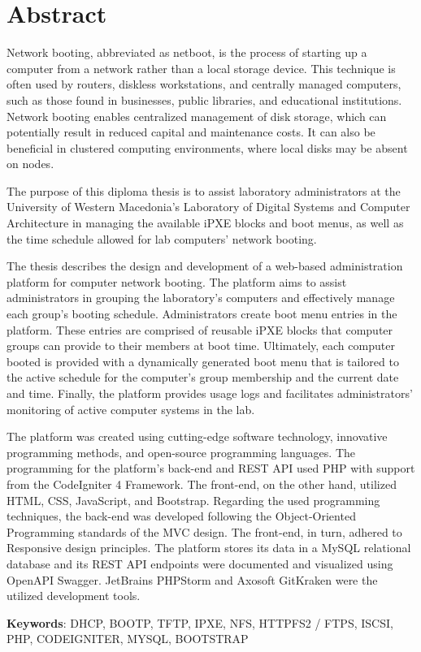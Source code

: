 \chapter*{Abstract}
Network booting, abbreviated as netboot, is the process of starting up a computer from a network rather than a local storage device. This technique is often used by routers, diskless workstations, and centrally managed computers, such as those found in businesses, public libraries, and educational institutions. Network booting enables centralized management of disk storage, which can potentially result in reduced capital and maintenance costs. It can also be beneficial in clustered computing environments, where local disks may be absent on nodes.

The purpose of this diploma thesis is to assist laboratory administrators at the University of Western Macedonia's Laboratory of Digital Systems and Computer Architecture in managing the available iPXE blocks and boot menus, as well as the time schedule allowed for lab computers' network booting.

The thesis describes the design and development of a web-based administration platform for computer network booting. The platform aims to assist administrators in grouping the laboratory's computers and effectively manage each group's booting schedule. Administrators create boot menu entries in the platform. These entries are comprised of reusable iPXE blocks that computer groups can provide to their members at boot time. Ultimately, each computer booted is provided with a dynamically generated boot menu that is tailored to the active schedule for the computer's group membership and the current date and time. Finally, the platform provides usage logs and facilitates administrators' monitoring of active computer systems in the lab.

The platform was created using cutting-edge software technology, innovative programming methods, and open-source programming languages. The programming for the platform's back-end and REST API used PHP with support from the CodeIgniter 4 Framework. The front-end, on the other hand, utilized HTML, CSS, JavaScript, and Bootstrap. Regarding the used programming techniques, the back-end was developed following the Object-Oriented Programming standards of the MVC design. The front-end, in turn, adhered to Responsive design principles. The platform stores its data in a MySQL relational database and its REST API endpoints were documented and visualized using OpenAPI Swagger. JetBrains PHPStorm and Axosoft GitKraken were the utilized development tools.

\vfill
\textbf{Keywords}: DHCP, BOOTP, TFTP, IPXE, NFS, HTTPFS2 / FTPS, ISCSI, PHP, CODEIGNITER, MYSQL, BOOTSTRAP
